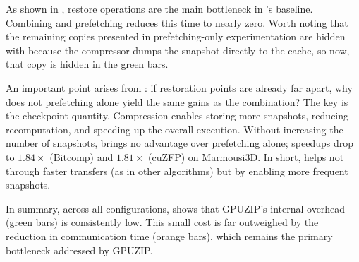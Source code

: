 \documentclass[Ingles,Final]{ic-tese-v3}
\begin{document}
As shown in , restore operations are the main bottleneck in \uniform's baseline. Combining \compression and prefetching reduces this time to nearly zero. Worth noting that the remaining \dtd copies presented in prefetching-only experimentation are hidden with \compression because the compressor dumps the snapshot directly to the cache, so now, that \dtd copy is hidden in the green bars.

An important point arises from \uniform: if restoration points are already far apart, why does not prefetching alone yield the same gains as the combination? The key is the checkpoint quantity. Compression enables storing more snapshots, reducing recomputation, and speeding up the overall execution. Without increasing the number of snapshots, \compression brings no advantage over prefetching alone; speedups drop to $1.84\times$ (Bitcomp) and $1.81\times$ (cuZFP) on Marmousi3D. In short, \compression helps not through faster transfers (as in other \checkpointing algorithms) but by enabling more frequent snapshots.

In summary, across all configurations,  shows that GPUZIP's internal overhead (green bars) is consistently low. This small cost is far outweighed by the reduction in communication time (orange bars), which remains the primary bottleneck addressed by GPUZIP.
\end{document}
